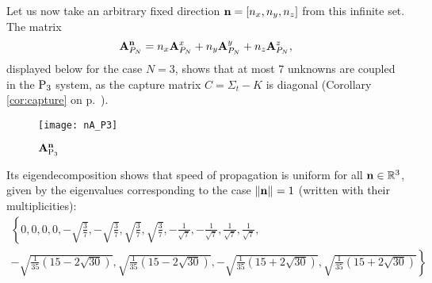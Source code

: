 Let us now take an arbitrary fixed direction $\bn = [n_x,n_y,n_z]$ from this infinite set. 
The matrix
$$
	\mat{A}_{P_N}^{\bn} = n_x \mat{A}_{P_N}^x + n_y \mat{A}_{P_N}^y + n_z \mat{A}_{P_N}^z,
$$
displayed below for the case $N = 3$, shows that at most 7 unknowns are coupled in the $\PN[3]$ system, as the
capture matrix $C = \Sigma_t - K$ is diagonal (Corollary \ref{cor:capture} on p.~\pageref{cor:capture}).

\begin{figure}[htb]
\hspace*{-1.1cm}
  \texttt{[image: nA\_P3]}
  \caption{$\mat{A}_{\PN[3]}^{\bn}$}
  \label{fig:nAP3}
\end{figure}

Its eigendecomposition
shows that speed of propagation is uniform for all $\bn\in\R[3]$, given by the eigenvalues corresponding to the case
$\norm{\bn} = 1$ (written with their multiplicities):
$$
\begin{multlined}
\textstyle
\left\{0,0,0,0,-\sqrt{\frac{3}{7}},-\sqrt{\frac{3}{7}},\sqrt{\frac{3}{7}},\sqrt{\frac{3}{7}},-\frac{1}{\sqrt{7}},
-\frac{1}{\sqrt{7}},\frac{1}{\sqrt{7}},\frac{1}{\sqrt{7}},\right.\\
\textstyle
\left.-\sqrt{\frac{1}{35} \left(15-2 \sqrt{30}\right)},
\sqrt{\frac{1}{35} \left(15-2 \sqrt{30}\right)},-\sqrt{\frac{1}{35} \left(15+2 \sqrt{30}\right)},\sqrt{\frac{1}{35} 
\left(15+2 \sqrt{30}\right)}\right\}
\end{multlined} 
$$

